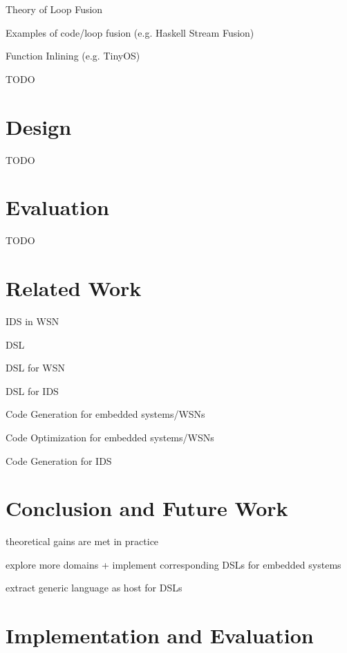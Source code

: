\documentclass[conference]{IEEEtran}
\begin{document}
Theory of Loop Fusion \cite{darte2000complexity}

Examples of code/loop fusion (e.g. Haskell Stream Fusion) \cite{coutts2007stream}

Function Inlining (e.g. TinyOS) \cite{gay2007software,gay2003nesc}

TODO

\section{Design}
\label{design}

TODO

\section{Evaluation}
\label{evaluation}

TODO

\section{Related Work}
\label{related}

IDS in WSN \cite{perrig2004security,mishra2004intrusion}

DSL \cite{fowler2010domain,mernik2005and}

DSL for WSN \cite{naumowicz2009prototyping,levis2004tinyscript}

DSL for IDS \cite{eckmann2002statl}

Code Generation for embedded systems/WSNs \cite{leupers2000code,marwedel2002code}

Code Optimization for embedded systems/WSNs \cite{panda2001data,naik2001software}

Code Generation for IDS \cite{charitakis2003code}

\section{Conclusion and Future Work}
\label{conclusion}

theoretical gains are met in practice

explore more domains + implement corresponding DSLs for embedded systems

extract generic language as host for DSLs

\section{Implementation and Evaluation}
\end{document}
